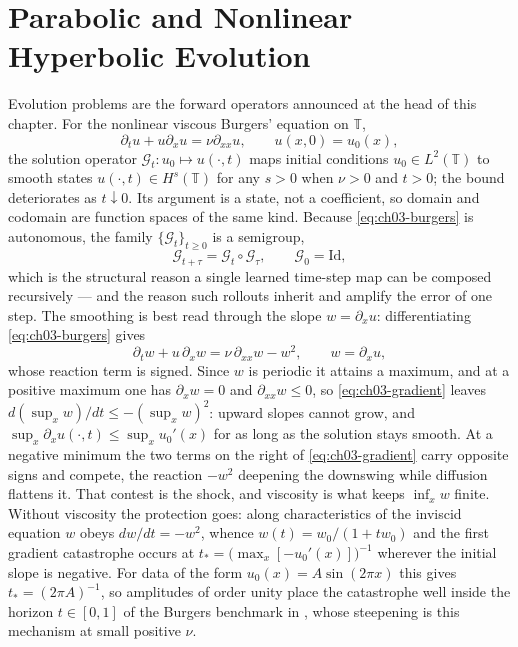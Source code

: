 \section{Parabolic and Nonlinear Hyperbolic Evolution}
Evolution problems are the forward operators announced at the head of this chapter.
For the nonlinear viscous Burgers' equation on $\mathbb{T}$,
\begin{equation}
  \partial_t u + u \partial_x u = \nu \partial_{xx} u, \qquad u(x, 0) = u_0(x),
  \label{eq:ch03-burgers}
\end{equation}
the solution operator $\mathcal{G}_t : u_0 \mapsto u(\cdot, t)$ maps initial
conditions $u_0 \in L^2(\mathbb{T})$ to smooth states $u(\cdot, t) \in H^s(\mathbb{T})$
for any $s > 0$ when $\nu > 0$ and $t > 0$; the bound deteriorates as $t \downarrow 0$.
Its argument is a state, not a coefficient, so
domain and codomain are function spaces of the same kind. Because
\eqref{eq:ch03-burgers} is autonomous,
the family $\{\mathcal{G}_t\}_{t \ge 0}$ is a semigroup,
\begin{equation}
  \mathcal{G}_{t+\tau} = \mathcal{G}_t \circ \mathcal{G}_\tau, \qquad \mathcal{G}_0 = \mathrm{Id},
  \label{eq:ch03-semigroup}
\end{equation}
which is the structural reason a single learned time-step map can be composed
recursively --- and the reason such rollouts inherit and amplify the error of
one step. The smoothing is best read through the slope $w = \partial_x u$:
differentiating \eqref{eq:ch03-burgers} gives
\begin{equation}
  \partial_t w + u\, \partial_x w = \nu\, \partial_{xx} w - w^2,
  \qquad w = \partial_x u,
  \label{eq:ch03-gradient}
\end{equation}
whose reaction term is signed. Since $w$ is periodic it attains a maximum, and at
a positive maximum one has $\partial_x w = 0$ and $\partial_{xx} w \le 0$, so
\eqref{eq:ch03-gradient} leaves $d(\sup_x w)/dt \le -(\sup_x w)^2$: upward slopes
cannot grow, and $\sup_x \partial_x u(\cdot, t) \le \sup_x u_0'(x)$ for as long
as the solution stays smooth. At a negative minimum the two terms on the right
of \eqref{eq:ch03-gradient} carry opposite signs and compete, the reaction
$-w^2$ deepening the downswing while diffusion flattens it. That contest is the
shock, and viscosity is what keeps $\inf_x w$ finite. Without
viscosity the protection goes: along characteristics of the inviscid equation $w$
obeys $dw/dt = -w^2$,
whence $w(t) = w_0/(1 + t w_0)$ and the first gradient catastrophe occurs at
$t_* = \big(\max_x[-u_0'(x)]\big)^{-1}$ wherever the initial slope is negative.
For data of the form $u_0(x) = A\sin(2\pi x)$ this gives $t_* = (2\pi A)^{-1}$,
so amplitudes of order unity place the catastrophe well inside the horizon
$t \in [0,1]$ of the Burgers benchmark in , whose steepening is
this mechanism at small positive $\nu$.

